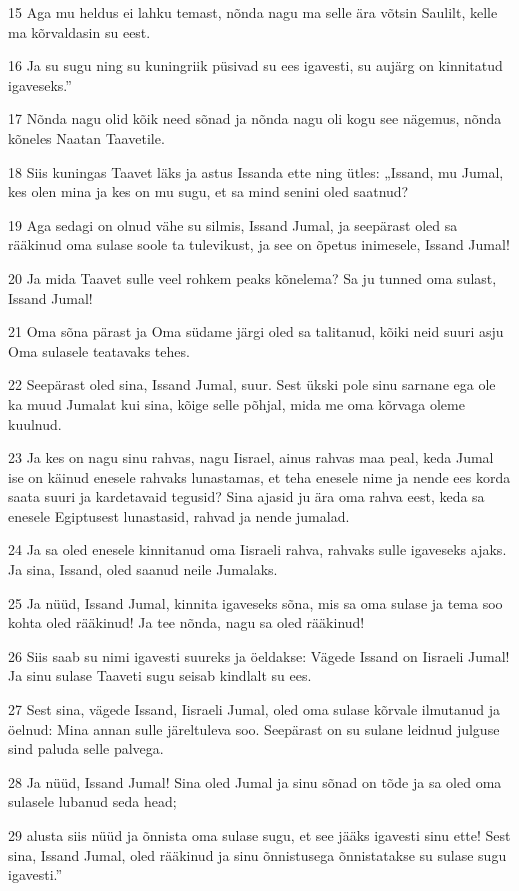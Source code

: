 \par 15 Aga mu heldus ei lahku temast, nõnda nagu ma selle ära võtsin Saulilt, kelle ma kõrvaldasin su eest.
\par 16 Ja su sugu ning su kuningriik püsivad su ees igavesti, su aujärg on kinnitatud igaveseks.”
\par 17 Nõnda nagu olid kõik need sõnad ja nõnda nagu oli kogu see nägemus, nõnda kõneles Naatan Taavetile.
\par 18 Siis kuningas Taavet läks ja astus Issanda ette ning ütles: „Issand, mu Jumal, kes olen mina ja kes on mu sugu, et sa mind senini oled saatnud?
\par 19 Aga sedagi on olnud vähe su silmis, Issand Jumal, ja seepärast oled sa rääkinud oma sulase soole ta tulevikust, ja see on õpetus inimesele, Issand Jumal!
\par 20 Ja mida Taavet sulle veel rohkem peaks kõnelema? Sa ju tunned oma sulast, Issand Jumal!
\par 21 Oma sõna pärast ja Oma südame järgi oled sa talitanud, kõiki neid suuri asju Oma sulasele teatavaks tehes.
\par 22 Seepärast oled sina, Issand Jumal, suur. Sest ükski pole sinu sarnane ega ole ka muud Jumalat kui sina, kõige selle põhjal, mida me oma kõrvaga oleme kuulnud.
\par 23 Ja kes on nagu sinu rahvas, nagu Iisrael, ainus rahvas maa peal, keda Jumal ise on käinud enesele rahvaks lunastamas, et teha enesele nime ja nende ees korda saata suuri ja kardetavaid tegusid? Sina ajasid ju ära oma rahva eest, keda sa enesele Egiptusest lunastasid, rahvad ja nende jumalad.
\par 24 Ja sa oled enesele kinnitanud oma Iisraeli rahva, rahvaks sulle igaveseks ajaks. Ja sina, Issand, oled saanud neile Jumalaks.
\par 25 Ja nüüd, Issand Jumal, kinnita igaveseks sõna, mis sa oma sulase ja tema soo kohta oled rääkinud! Ja tee nõnda, nagu sa oled rääkinud!
\par 26 Siis saab su nimi igavesti suureks ja öeldakse: Vägede Issand on Iisraeli Jumal! Ja sinu sulase Taaveti sugu seisab kindlalt su ees.
\par 27 Sest sina, vägede Issand, Iisraeli Jumal, oled oma sulase kõrvale ilmutanud ja öelnud: Mina annan sulle järeltuleva soo. Seepärast on su sulane leidnud julguse sind paluda selle palvega.
\par 28 Ja nüüd, Issand Jumal! Sina oled Jumal ja sinu sõnad on tõde ja sa oled oma sulasele lubanud seda head;
\par 29 alusta siis nüüd ja õnnista oma sulase sugu, et see jääks igavesti sinu ette! Sest sina, Issand Jumal, oled rääkinud ja sinu õnnistusega õnnistatakse su sulase sugu igavesti.”

